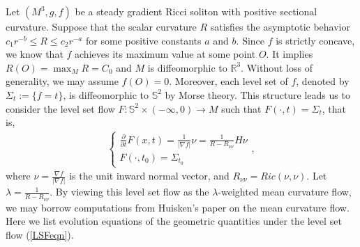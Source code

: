 \documentclass[12pt,a4paper]{amsart}
\begin{document}
Let $(M^3,g,f)$ be a steady gradient Ricci soliton with positive sectional curvature.
Suppose that the scalar curvature $R$ satisfies the asymptotic behavior $c_1 r^{-b}\leq R\leq c_2 r^{-a}$ for some positive constants $a$ and $b$.
Since $f$ is strictly concave, we know that $f$ achieves its maximum value at some point $O$.
It implies $R(O)=\max_M R=C_0$ and $M$ is diffeomorphic to $\mathbb{R}^3$.
Without loss of generality, we may assume $f(O)=0$.
Moreover, each level set of $f$, denoted by $\Sigma_t:=\{f=t\}$, is diffeomorphic to $\mathbb{S}^2$ by Morse theory.
This structure leads us to consider the level set flow $F:\mathbb{S}^2\times(-\infty,0)\to M$ such that $F(\cdot,t)=\Sigma_t$,
that is,
\begin{align}
\left\{
\begin{array}{l}
\displaystyle\frac{\partial}{\partial t}F(x,t)=\frac{1}{|\nabla f|}\nu=\frac{1}{R-R_{\nu\nu}}H\nu \\[4mm]
F(\cdot,t_0)=\Sigma_{t_0}
\end{array}
\right., \label{LSFeqn}
\end{align}
where $\nu=\frac{\nabla f}{|\nabla f|}$ is the unit inward normal vector, and $R_{\nu\nu}=Ric(\nu,\nu)$.
Let $\lambda=\frac{1}{R-R_{\nu\nu}}$.
By viewing this level set flow as the $\lambda$-weighted mean curvature flow,
we may borrow computations from Huisken's paper \cite{Huisken86} on the mean curvature flow.
Here we list evolution equations of the geometric quantities under the level set flow (\ref{LSFeqn}).
\end{document}
